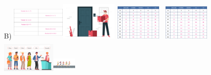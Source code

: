 B)
\includegraphics[width=1.02736in,height=0.68704in]{media/image110.png}\includegraphics[width=1.09268in,height=0.73073in]{media/image112.png}\includegraphics[width=1.01042in,height=0.67572in]{media/image111.png}\includegraphics[width=1.01042in,height=0.67572in]{media/image111.png}\includegraphics[width=1.04264in,height=0.69727in]{media/image113.png}\includegraphics[width=0.45621in,height=0.44100in]{media/image138.png}

